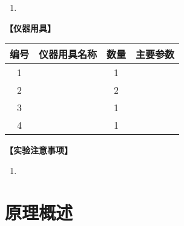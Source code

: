 \documentclass{ctexart}
\numberwithin{equation}{section}%
\theoremstyle{ansstyle}
\begin{document}
\begin{enumerate}
    \item %
\end{enumerate}
    

\large{\textbf{【仪器用具】}} %

\begin{center}
    \begin{tabular}{|c|c|c|p{8cm}|}%
        \hline
        编号 & 仪器用具名称 & 数量 & 主要参数 \\
        \hline
        1 &  & 1 &  \\ %
        \hline
        2 &  & 2 &  \\
        \hline
        3  &   & 1 &  \\
        \hline
        4  &   & 1 &  \\
        \hline
    \end{tabular}
\end{center}


\large{\textbf{【实验注意事项】}} %

\begin{enumerate}
    \item 
\end{enumerate}


\section{原理概述}
% 

\end{document}
